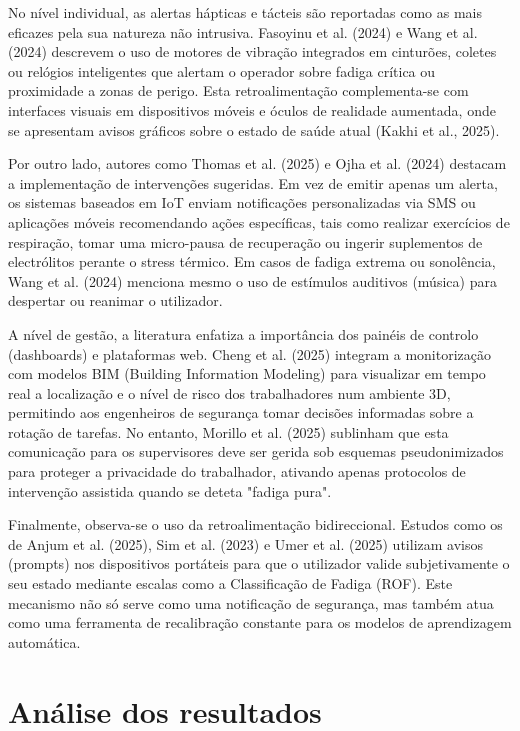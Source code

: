 No nível individual, as alertas hápticas e tácteis são reportadas como as mais eficazes pela sua natureza não intrusiva. Fasoyinu et al. (2024) e Wang et al. (2024)\cite{fasoyinu2025,wang2024} descrevem o uso de motores de vibração integrados em cinturões, coletes ou relógios inteligentes que alertam o operador sobre fadiga crítica ou proximidade a zonas de perigo. Esta retroalimentação complementa-se com interfaces visuais em dispositivos móveis e óculos de realidade aumentada, onde se apresentam avisos gráficos sobre o estado de saúde atual (Kakhi et al., 2025)\cite{kakhi2025}.

Por outro lado, autores como Thomas et al. (2025)\cite{thomas2025} e Ojha et al. (2024)\cite{ojha2024} destacam a implementação de intervenções sugeridas. Em vez de emitir apenas um alerta, os sistemas baseados em IoT enviam notificações personalizadas via SMS ou aplicações móveis recomendando ações específicas, tais como realizar exercícios de respiração, tomar uma micro-pausa de recuperação ou ingerir suplementos de electrólitos perante o stress térmico. Em casos de fadiga extrema ou sonolência, Wang et al. (2024)\cite{wang2024} menciona mesmo o uso de estímulos auditivos (música) para despertar ou reanimar o utilizador.

A nível de gestão, a literatura enfatiza a importância dos painéis de controlo (dashboards) e plataformas web. Cheng et al. (2025)\cite{cheng2025} integram a monitorização com modelos BIM (Building Information Modeling) para visualizar em tempo real a localização e o nível de risco dos trabalhadores num ambiente 3D, permitindo aos engenheiros de segurança tomar decisões informadas sobre a rotação de tarefas. No entanto, Morillo et al. (2025)\cite{albarran2025} sublinham que esta comunicação para os supervisores deve ser gerida sob esquemas pseudonimizados para proteger a privacidade do trabalhador, ativando apenas protocolos de intervenção assistida quando se deteta "fadiga pura".

Finalmente, observa-se o uso da retroalimentação bidireccional. Estudos como os de Anjum et al. (2025)\cite{anjum2025}, Sim et al. (2023)\cite{sim2023} e Umer et al. (2025)\cite{umer2025} utilizam avisos (prompts) nos dispositivos portáteis para que o utilizador valide subjetivamente o seu estado mediante escalas como a Classificação de Fadiga (ROF). Este mecanismo não só serve como uma notificação de segurança, mas também atua como uma ferramenta de recalibração constante para os modelos de aprendizagem automática.

\section{Análise dos resultados}
\label{sec:analisis}

